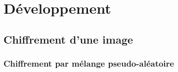 \section{Développement}

    \subsection{Chiffrement d'une image}

        \begin{frame}
            \frametitle{Chiffrement par mélange pseudo-aléatoire}
            \pause
            \begin{columns}
                \begin{column}{.45\linewidth}
                \end{column}
                \pause
                \begin{column}{.45\linewidth}
                \end{column}
            \end{columns}
        \end{frame}

